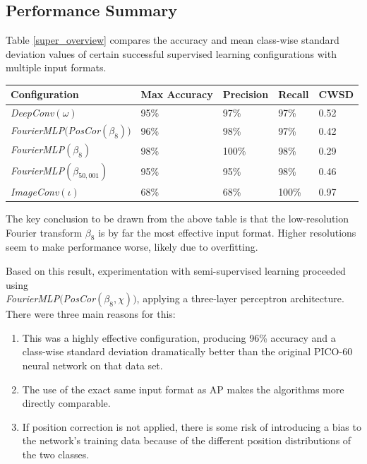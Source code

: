\documentclass[10pt]{article}
\begin{document}
\subsection{Performance Summary}

Table \ref{super_overview} compares the accuracy and mean class-wise standard deviation values of certain successful supervised learning configurations with multiple input formats.

\begin{minipage}{\textwidth}
    \begin{center}
         \label{super_overview}
        \begin{tabular}{|l|l|l|l|l|}
            \hline
            Configuration & Max Accuracy & Precision & Recall & CWSD \\
            \hline
            {\it DeepConv}$(\omega)$ & 95\% & 97\% & 97\% & 0.52 \\
            \hline
            {\it FourierMLP}$(${\it PosCor}$(\beta_{8}))$ & 96\% & 98\% & 97\% & 0.42 \\
            \hline
            {\it FourierMLP}$(\beta_{8})$ & 98\% & 100\% & 98\% & 0.29 \\
            \hline
            {\it FourierMLP}$(\beta_{50,001})$ & 95\% & 95\% & 98\% & 0.46 \\
            \hline
            {\it ImageConv}$(\iota)$ & 68\% & 68\% & 100\% & 0.97 \\
            \hline
        \end{tabular}
    \end{center}
\end{minipage}

The key conclusion to be drawn from the above table is that the low-resolution Fourier transform $\beta_{8}$ is by far the most effective input format. Higher resolutions seem to make performance worse, likely due to overfitting.

Based on this result, experimentation with semi-supervised learning proceeded using \\ {\it FourierMLP}$(${\it PosCor}$(\beta_{8}, \chi))$, applying a three-layer perceptron architecture. There were three main reasons for this:

\begin{enumerate}
    \item This was a highly effective configuration, producing 96\% accuracy and a class-wise standard deviation dramatically better than the original PICO-60 neural network on that data set.
    \item The use of the exact same input format as AP makes the algorithms more directly comparable.
    \item If position correction is not applied, there is some risk of introducing a bias to the network's training data because of the different position distributions of the two classes.
\end{enumerate}
\end{document}
